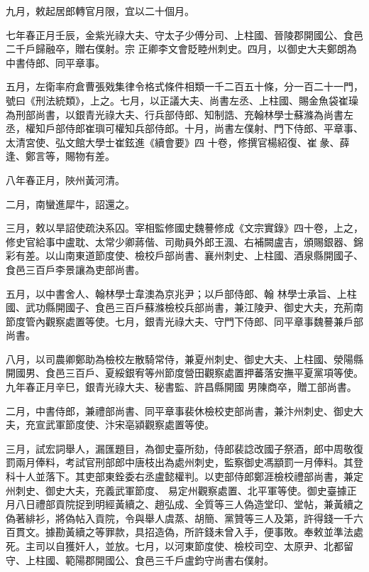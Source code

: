 \begin{pinyinscope}
 九月，敕起居郎轉官月限，宜以二十個月。



 七年春正月壬辰，金紫光祿大夫、守太子少傅分司、上柱國、晉陵郡開國公、食邑二千戶歸融卒，贈右僕射。宗
 正卿李文會貶睦州刺史。四月，以御史大夫鄭朗為中書侍郎、同平章事。



 五月，左衛率府倉曹張戣集律令格式條件相類一千二百五十條，分一百二十一門，號曰《刑法統類》，上之。七月，以正議大夫、尚書左丞、上柱國、賜金魚袋崔璪為刑部尚書，以銀青光祿大夫、行兵部侍郎、知制誥、充翰林學士蘇滌為尚書左丞，權知戶部侍郎崔璵可權知兵部侍郎。十月，尚書左僕射、門下侍郎、平章事、太清宮使、弘文館大學士崔鉉進《續會要》四
 十卷，修撰官楊紹復、崔彖、薛逢、鄭言等，賜物有差。



 八年春正月，陜州黃河清。



 二月，南蠻進犀牛，詔還之。



 三月，敕以旱詔使疏決系囚。宰相監修國史魏謩修成《文宗實錄》四十卷，上之，修史官給事中盧耽、太常少卿蔣偕、司勛員外郎王渢、右補闕盧吉，頒賜銀器、錦彩有差。以山南東道節度使、檢校戶部尚書、襄州刺史、上柱國、酒泉縣開國子、食邑三百戶李景讓為吏部尚書。



 五月，以中書舍人、翰林學士韋澳為京兆尹；以戶部侍郎、翰
 林學士承旨、上柱國、武功縣開國子、食邑三百戶蘇滌檢校兵部尚書，兼江陵尹、御史大夫，充荊南節度管內觀察處置等使。七月，銀青光祿大夫、守門下侍郎、同平章事魏謩兼戶部尚書。



 八月，以司農卿鄭助為檢校左散騎常侍，兼夏州刺史、御史大夫、上柱國、滎陽縣開國男、食邑三百戶、夏綏銀宥等州節度營田觀察處置押蕃落安撫平夏黨項等使。九年春正月辛巳，銀青光祿大夫、秘書監、許昌縣開國
 男陳商卒，贈工部尚書。



 二月，中書侍郎，兼禮部尚書、同平章事裴休檢校吏部尚書，兼汴州刺史、御史大夫，充宣武軍節度使、汴宋亳潁觀察處置等使。



 三月，試宏詞舉人，漏匯題目，為御史臺所劾，侍郎裴諗改國子祭酒，郎中周敬復罰兩月俸料，考試官刑部郎中唐枝出為處州刺史，監察御史馮顓罰一月俸料。其登科十人並落下。其吏部東銓委右丞盧懿權判。以吏部侍郎鄭涯檢校禮部尚書，兼定州刺史、御史大夫，充義武軍節度、
 易定州觀察處置、北平軍等使。御史臺據正月八日禮部貢院捉到明經黃續之、趙弘成、全質等三人偽造堂印、堂帖，兼黃續之偽著緋衫，將偽帖入貢院，令與舉人虞蒸、胡簡、黨贊等三人及第，許得錢一千六百貫文。據勘黃續之等罪款，具招造偽，所許錢未曾入手，便事敗。奉敕並準法處死。主司以自獲奸人，並放。七月，以河東節度使、檢校司空、太原尹、北都留守、上柱國、範陽郡開國公、食邑三千戶盧鈞守尚書右僕射。




\end{pinyinscope}
